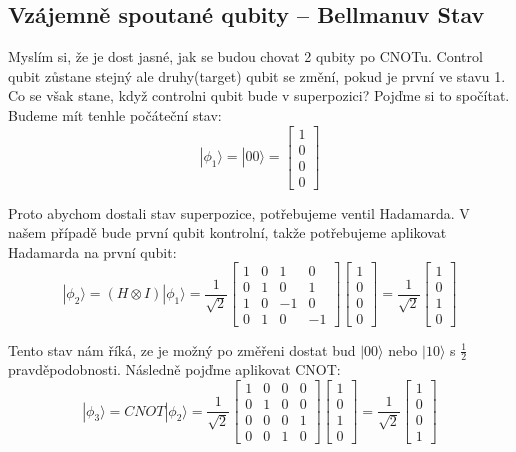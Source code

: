 \documentclass[11pt]{article}
\begin{document}
\subsection{Vzájemně spoutané qubity – Bellmanuv Stav}
Myslím si, že je dost jasné, jak se budou chovat 2 qubity po CNOTu.
Control qubit zůstane stejný ale druhy(target) qubit se změní, pokud je první ve stavu 1.
Co se však stane, když controlni qubit bude v superpozici? Pojďme si to spočítat.
Budeme mít tenhle počáteční stav:
$$|\phi_1 \rangle = |00\rangle = \begin{bmatrix}
        1 \\
        0 \\
        0 \\
        0
    \end{bmatrix}$$
\par Proto abychom dostali stav superpozice, potřebujeme ventil Hadamarda.
V našem případě bude první qubit kontrolní, takže potřebujeme aplikovat Hadamarda na první qubit:
$$|\phi_2 \rangle = (H \otimes I) |\phi_1 \rangle = \frac{1}{\sqrt{2}} \begin{bmatrix}
        1 & 0 & 1  & 0  \\
        0 & 1 & 0  & 1  \\
        1 & 0 & -1 & 0  \\
        0 & 1 & 0  & -1
    \end{bmatrix}\begin{bmatrix}
        1 \\
        0 \\
        0 \\
        0
    \end{bmatrix} = \frac{1}{\sqrt{2}}\begin{bmatrix}
        1 \\
        0 \\
        1 \\
        0
    \end{bmatrix}$$
\par Tento stav nám říká, ze je možný po změřeni dostat bud $|00\rangle$ nebo $|10\rangle$ s $\frac{1}{2}$ pravděpodobnosti.
Následně pojďme aplikovat CNOT:
$$|\phi_3 \rangle = CNOT |\phi_2 \rangle = \frac{1}{\sqrt{2}} \begin{bmatrix}
        1 & 0 & 0 & 0 \\
        0 & 1 & 0 & 0 \\
        0 & 0 & 0 & 1 \\
        0 & 0 & 1 & 0
    \end{bmatrix}\begin{bmatrix}
        1 \\
        0 \\
        1 \\
        0
    \end{bmatrix} = \frac{1}{\sqrt{2}}\begin{bmatrix}
        1 \\
        0 \\
        0 \\
        1
    \end{bmatrix}$$
\end{document}
